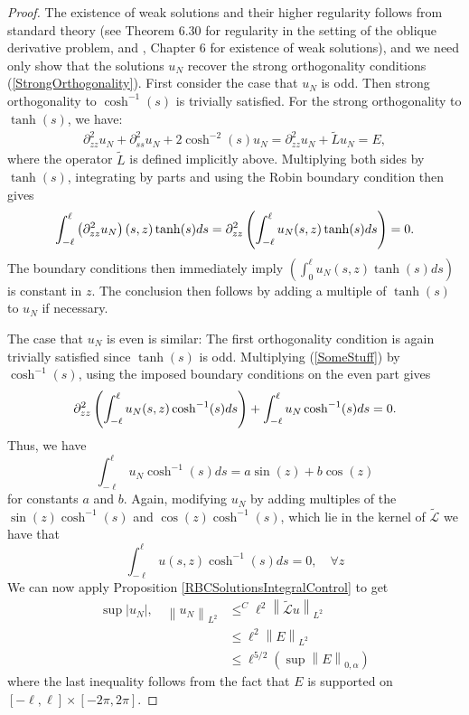 \documentclass{amsart}
\newcommand{\mc}{\mathcal}
\newcommand{\wt}{\widetilde}
\begin{document}
 \begin{proof} 
The existence of weak solutions and their higher regularity  follows from standard theory (see \cite{GT}  Theorem 6.30 for regularity in the setting of the oblique derivative problem, and \cite{Ev}, Chapter 6 for existence of weak solutions), and we need only  show that the solutions $u_N$ recover the strong orthogonality conditions (\ref{StrongOrthogonality}). First consider the case that $u_N$ is odd. Then  strong orthogonality  to $\cosh^{-1}(s)$  is trivially satisfied. For the strong orthogonality to $\tanh(s)$, we have:
 \begin{align} \label{SomeStuff}
 \partial^2_{z z}u_N + \partial^2_{s s} u_N + 2 \cosh^{-2} (s) u_N =  \partial^2_{z z}u_N + \tilde{L} u_N = E,
 \end{align}
 where the operator $\wt{L}$ is defined implicitly above. Multiplying both sides by $\tanh(s)$, integrating by parts and using the Robin boundary condition then gives
 \begin{align} \notag
 \int_{-\ell}^\ell  \left(\partial^2_{z z}u_N\right)(s, z) \tanh(s) ds =    \partial^2_{z z}\left(\int_{-\ell}^\ell  u_N(s, z) \tanh(s) ds \right)= 0.
 \end{align}
 The boundary conditions  then immediately imply $\left(\int_0^\ell  u_N(s, z) \tanh (s)ds \right) $ is constant in $z$. The conclusion then follows by adding a multiple of $\tanh(s)$ to $u_N$ if necessary. 
 
 The case that $u_N$ is even is similar: The first orthogonality condition is again trivially satisfied since $\tanh(s)$ is odd. Multiplying  (\ref{SomeStuff}) by $\cosh^{-1}(s)$, using the imposed boundary conditions on the even part gives
  \begin{align} \notag
   \partial^2_{z z}\left(\int_{-\ell}^\ell  u_N(s, z) \cosh^{-1}(s) ds \right)  + \int_{-\ell}^{\ell} u_N \cosh^{-1}(s) ds= 0.
 \end{align}
 Thus, we have
 \[
  \int_{-\ell}^{\ell} u_N \cosh^{-1}(s) ds = a \sin(z) + b \cos(z)
 \]
 for constants $a$ and $b$. Again, modifying $u_N$ by adding multiples of the $\sin(z)\cosh^{-1}(s)$ and $\cos(z)\cosh^{-1}(s)$, which lie in the kernel of $\wt{\mc{L}}$ we have that 
 \[
   \int_{-\ell}^{\ell} u(s, z) \cosh^{-1}(s)  ds = 0, \quad \forall z
 \]
 We can now apply Proposition \ref{RBCSolutionsIntegralControl} to get
 \begin{align*}
 \sup \left|u_N \right|, \quad \left\| u_N\right\|_{L^2} & \leq^C \ell^2 \left\|\wt{\mc{L}} u \right\|_{L^2}  \\
 & \leq \ell^2 \left\| E\right\|_{L^2}  \\
 & \leq \ell^{5/2} \left(\sup\left\|  E\right\|_{0, \alpha}\right)
 \end{align*}
 where the last inequality follows from the fact that  $E$ is supported on $[- \ell,  \ell] \times [- 2\pi , 2\pi]$.
 \end{proof}
 
\end{document}
